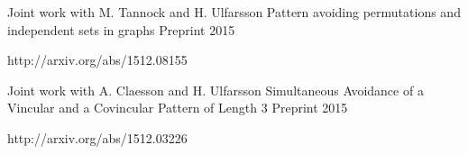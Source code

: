


\begin{cventries}

  \cventry
    {Joint work with M. Tannock and H. Ulfarsson} %
    {Pattern avoiding permutations and independent sets in graphs} %
    {} %
    {Preprint 2015} %
    {
      \begin{cvitems} %
        \item {http://arxiv.org/abs/1512.08155}
      \end{cvitems}
    }

  \cventry
    {Joint work with A. Claesson and H. Ulfarsson} %
    {Simultaneous Avoidance of a Vincular and a Covincular Pattern of Length 3} %
    {} %
    {Preprint 2015} %
    {
      \begin{cvitems} %
        \item {http://arxiv.org/abs/1512.03226}
      \end{cvitems}
    }

\end{cventries}
